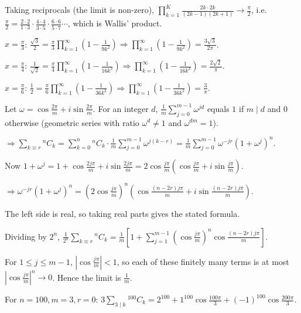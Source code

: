   Taking reciprocals (the limit is non-zero), $\displaystyle\prod_{k = 1}^K\frac{2k\cdot 2k}{(2k - 1)(2k +
    1)}\to\frac{\pi}{2}$, i.e.\ $\frac{\pi}{2} = \frac{2\cdot 2}{1\cdot 3}\cdot\frac{4\cdot 4}{3\cdot
    5}\cdot\frac{6\cdot 6}{5\cdot 7}\cdots$, which is Wallis' product.

  $x = \frac{\pi}{3}$: $\frac{\sqrt{3}}{2} = \frac{\pi}{3}\displaystyle\prod_{k = 1}^\infty\left(1 -
  \frac{1}{9k^2}\right)\Rightarrow\prod_{k = 1}^\infty\left(1 - \frac{1}{9k^2}\right) = \frac{3\sqrt{3}}{2\pi}$.

  $x = \frac{\pi}{4}$: $\frac{1}{\sqrt{2}} = \frac{\pi}{4}\displaystyle\prod_{k = 1}^\infty\left(1 -
  \frac{1}{16k^2}\right)\Rightarrow\prod_{k = 1}^\infty\left(1 - \frac{1}{16k^2}\right) = \frac{2\sqrt{2}}{\pi}$.

  $x = \frac{\pi}{6}$: $\frac{1}{2} = \frac{\pi}{6}\displaystyle\prod_{k = 1}^\infty\left(1 -
  \frac{1}{36k^2}\right)\Rightarrow\prod_{k = 1}^\infty\left(1 - \frac{1}{36k^2}\right) = \frac{3}{\pi}$.
\item Let $\omega = \cos\frac{2\pi}{m} + i\sin\frac{2\pi}{m}$. For an integer $d$, $\frac{1}{m}\displaystyle\sum_{j
    = 0}^{m - 1}\omega^{jd}$ equals $1$ if $m\mid d$ and $0$ otherwise (geometric series with ratio
  $\omega^d\neq 1$ and $\omega^{dm} = 1$).

  $\Rightarrow\displaystyle\sum_{k\equiv r}{}^nC_k = \sum_{k = 0}^n{}^nC_k\cdot\frac{1}{m}\sum_{j = 0}^{m -
    1}\omega^{j(k - r)} = \frac{1}{m}\sum_{j = 0}^{m - 1}\omega^{-jr}(1 + \omega^j)^n$.

  Now $1 + \omega^j = 1 + \cos\frac{2j\pi}{m} + i\sin\frac{2j\pi}{m} = 2\cos\frac{j\pi}{m}\left(\cos\frac{j\pi}{m}
  + i\sin\frac{j\pi}{m}\right)$.

  $\Rightarrow\omega^{-jr}(1 + \omega^j)^n = \left(2\cos\frac{j\pi}{m}\right)^n\left(\cos\frac{(n - 2r)j\pi}{m}
  + i\sin\frac{(n - 2r)j\pi}{m}\right)$.

  The left side is real, so taking real parts gives the stated formula.

  Dividing by $2^n$, $\frac{1}{2^n}\displaystyle\sum_{k\equiv r}{}^nC_k = \frac{1}{m}\left[1 + \sum_{j = 1}^{m
    - 1}\left(\cos\frac{j\pi}{m}\right)^n\cos\frac{(n - 2r)j\pi}{m}\right]$.

  For $1\leq j\leq m - 1$, $\left|\cos\frac{j\pi}{m}\right| < 1$, so each of these finitely many terms is at
  most $\left|\cos\frac{j\pi}{m}\right|^n\to 0$. Hence the limit is $\frac{1}{m}$.

  For $n = 100, m = 3, r = 0$: $3\displaystyle\sum_{3\mid k}{}^{100}C_k = 2^{100} + 1^{100}\cos\frac{100\pi}{3}
  + (-1)^{100}\cos\frac{200\pi}{3}$.


